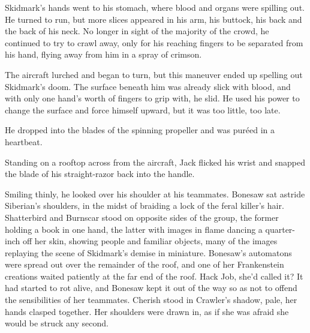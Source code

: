 Skidmark's hands went to his stomach, where blood and organs were spilling out.  He turned to run, but more slices appeared in his arm, his buttock, his back and the back of his neck.  No longer in sight of the majority of the crowd, he continued to try to crawl away, only for his reaching fingers to be separated from his hand, flying away from him in a spray of crimson.



The aircraft lurched and began to turn, but this maneuver ended up spelling out Skidmark's doom.  The surface beneath him was already slick with blood, and with only one hand's worth of fingers to grip with, he slid.  He used his power to change the surface and force himself upward, but it was too little, too late.



He dropped into the blades of the spinning propeller and was pur\'{e}ed in a heartbeat.



Standing on a rooftop across from the aircraft, Jack flicked his wrist and snapped the blade of his straight-razor back into the handle.



Smiling thinly, he looked over his shoulder at his teammates.  Bonesaw sat astride Siberian's shoulders, in the midst of braiding a lock of the feral killer's hair.  Shatterbird and Burnscar stood on opposite sides of the group, the former holding a book in one hand, the latter with images in flame dancing a quarter-inch off her skin, showing people and familiar objects, many of the images replaying the scene of Skidmark's demise in miniature.  Bonesaw's automatons were spread out over the remainder of the roof, and one of her Frankenstein creations waited patiently at the far end of the roof.  Hack Job, she'd called it?  It had started to rot alive, and Bonesaw kept it out of the way so as not to offend the sensibilities of her teammates.  Cherish stood in Crawler's shadow, pale, her hands clasped together.  Her shoulders were drawn in, as if she was afraid she would be struck any second.



